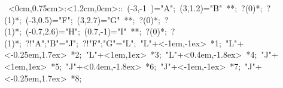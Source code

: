 %


\hbox{
\xy    <0cm,0.75cm>:<1.2cm,0cm>::
       (-3,-1 )="A"; (3,1.2)="B" **\dir{-}; ?(0)*\dir{<}; ?(1)*\dir{>};
       (-3,0.5)="F"; (3,2.7)="G" **\dir{-}; ?(0)*\dir{<}; ?(1)*\dir{>};
       (-0.7,2.6)="H"; (0.7,-1)="I" **\dir{-}; ?(0)*\dir{<}; ?(1)*\dir{>};
        ?!{"A";"B"}="J";   ?!{"F";"G"}="L";
       "L"+<-1em,-1ex> *{1};
       "L"+<-0.25em,1.7ex> *{2};
       "L"+<1em,1ex> *{3};
       "L"+<0.4em,-1.8ex> *{4};
       "J"+<1em,1ex> *{5};
       "J"+<0.4em,-1.8ex> *{6};
       "J"+<-1em,-1ex> *{7};
       "J"+<-0.25em,1.7ex> *{8};
\endxy}

